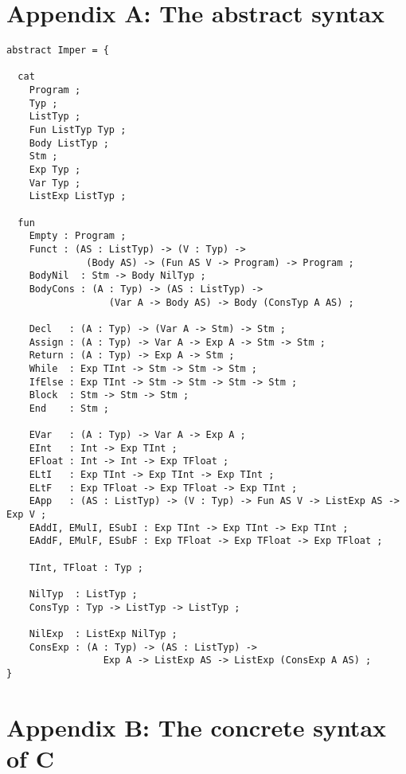 \documentclass[12pt]{article}
\begin{document}





\newpage
\section*{Appendix A: The abstract syntax}

\small
\begin{verbatim}
abstract Imper = {

  cat
    Program ;
    Typ ;
    ListTyp ;
    Fun ListTyp Typ ;
    Body ListTyp ;
    Stm ;
    Exp Typ ;
    Var Typ ;
    ListExp ListTyp ;

  fun
    Empty : Program ;
    Funct : (AS : ListTyp) -> (V : Typ) -> 
              (Body AS) -> (Fun AS V -> Program) -> Program ;
    BodyNil  : Stm -> Body NilTyp ;
    BodyCons : (A : Typ) -> (AS : ListTyp) -> 
                  (Var A -> Body AS) -> Body (ConsTyp A AS) ;

    Decl   : (A : Typ) -> (Var A -> Stm) -> Stm ;
    Assign : (A : Typ) -> Var A -> Exp A -> Stm -> Stm ;
    Return : (A : Typ) -> Exp A -> Stm ;
    While  : Exp TInt -> Stm -> Stm -> Stm ;
    IfElse : Exp TInt -> Stm -> Stm -> Stm -> Stm ;
    Block  : Stm -> Stm -> Stm ;
    End    : Stm ;

    EVar   : (A : Typ) -> Var A -> Exp A ;
    EInt   : Int -> Exp TInt ;
    EFloat : Int -> Int -> Exp TFloat ;
    ELtI   : Exp TInt -> Exp TInt -> Exp TInt ;
    ELtF   : Exp TFloat -> Exp TFloat -> Exp TInt ;
    EApp   : (AS : ListTyp) -> (V : Typ) -> Fun AS V -> ListExp AS -> Exp V ;
    EAddI, EMulI, ESubI : Exp TInt -> Exp TInt -> Exp TInt ;
    EAddF, EMulF, ESubF : Exp TFloat -> Exp TFloat -> Exp TFloat ;

    TInt, TFloat : Typ ;

    NilTyp  : ListTyp ;
    ConsTyp : Typ -> ListTyp -> ListTyp ;

    NilExp  : ListExp NilTyp ;
    ConsExp : (A : Typ) -> (AS : ListTyp) -> 
                 Exp A -> ListExp AS -> ListExp (ConsExp A AS) ;
}
\end{verbatim}
\normalsize
\newpage


\section*{Appendix B: The concrete syntax of C}
\end{document}
